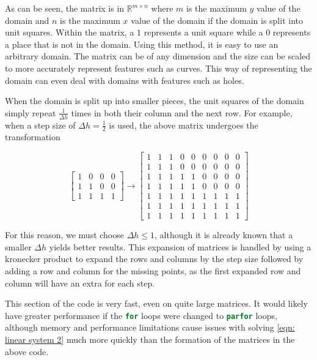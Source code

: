 \documentclass[10pt,a4paper]{article}
\begin{document}
As can be seen, the matrix is in $\mathbb{R}^{m \times n}$ where $m$ is the maximum $y$ value of the domain and $n$ is the maximum $x$ value of the domain if the domain is split into unit squares. Within the matrix, a $1$ represents a unit square while a $0$ represents a place that is not in the domain. Using this method, it is easy to use an arbitrary domain. The matrix can be of any dimension and the size can be scaled to more accurately represent features such as curves. This way of representing the domain can even deal with domains with features such as holes.

When the domain is split up into smaller pieces, the unit squares of the domain simply repeat $\frac{1}{\Delta h}$ times in both their column and the next row. For example, when a step size of $\Delta h = \frac{1}{2}$ is used, the above matrix undergoes the transformation

\begin{displaymath}
\left[
\begin{matrix}
1 & 0 & 0 & 0 \\
1 & 1 & 0 & 0 \\
1 & 1 & 1 & 1 
\end{matrix}
\right]
\to
\left[
\begin{matrix}
	1 & 1 & 1 & 0 & 0 & 0 & 0 & 0 & 0\\
	1 & 1 & 1 & 0 & 0 & 0 & 0 & 0 & 0\\
	1 & 1 & 1 & 1 & 1 & 0 & 0 & 0 & 0\\
	1 & 1 & 1 & 1 & 1 & 0 & 0 & 0 & 0\\
	1 & 1 & 1 & 1 & 1 & 1 & 1 & 1 & 1\\
	1 & 1 & 1 & 1 & 1 & 1 & 1 & 1 & 1\\
	1 & 1 & 1 & 1 & 1 & 1 & 1 & 1 & 1
\end{matrix}
\right]
\end{displaymath}

For this reason, we must choose $\Delta h \leq 1$, although it is already known that a smaller $\Delta h$ yields better results. This expansion of matrices is handled by using a kronecker product to expand the rows and columns by the step size followed by adding a row and column for the missing points, as the first expanded row and column will have an extra for each step.
\pagebreak


This section of the code is very fast, even on quite large matrices. It would likely have greater performance if the \lstinline[language=Matlab]|for| loops were changed to \lstinline[language=Matlab]|parfor| loops, although memory and performance limitations cause issues with solving \cref{eqn: linear system 2} much more quickly than the formation of the matrices in the above code.
\end{document}
